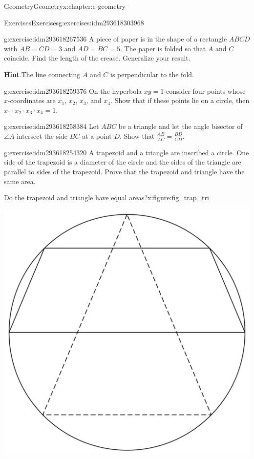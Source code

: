 \documentclass[twoside,10pt,]{book}
\newcommand{\blocktitlefont}{\relax}
\numberwithin{equation}{section}
\begin{document}
\begin{chapterptx}{Geometry}{}{Geometry}{}{}{x:chapter:c-geometry}
\begin{exercises-section}{Exercises}{}{Exercises}{}{}{g:exercises:idm293618303968}
\begin{divisionexercise}{6}{}{}{g:exercise:idm293618267536}%
A piece of paper is in the shape of a rectangle \(ABCD\) with \(AB=CD=3\) and \(AD=BC=5\). The paper is folded so that \(A\) and \(C\) coincide. Find the length of the crease.  Generalize your result.%
\par\smallskip%
\noindent\textbf{\blocktitlefont Hint}.\label{g:hint:idm293618262704}{}\hypertarget{g:hint:idm293618262704}{}\quad{}The line connecting \(A\) and \(C\) is perpendicular to the fold.%
\end{divisionexercise}%
\begin{divisionexercise}{7}{}{}{g:exercise:idm293618259376}%
On the hyperbola \(x y = 1\) consider four points whose \(x\)-coordinates are \(x_1\), \(x_2\), \(x_3\), and \(x_4\). Show that if these points lie on a circle, then \(x_1 \cdot  x_{2} \cdot x_{3}\cdot x_4 = 1\).%
\end{divisionexercise}%
\begin{divisionexercise}{8}{}{}{g:exercise:idm293618258384}%
Let \(ABC\) be a triangle and let the angle bisector of \(\angle A\) intersect the side \(BC\) at a point \(D\). Show that \(\frac{A B}{A C} = \frac{B D}{C D}\).%
\end{divisionexercise}%
\begin{divisionexercise}{9}{}{}{g:exercise:idm293618254320}%
A trapezoid and a triangle are inscribed a circle. One side of the trapezoid is a diameter of the circle and the sides of the  triangle are parallel to sides of the trapezoid. Prove that the trapezoid and triangle have the same area.%
\begin{figureptx}{Do the trapezoid and triangle have equal areas?}{x:figure:fig_trap_tri}{}%
\begin{image}{0.2}{0.6}{0.2}%
\includegraphics[width=\linewidth]{images/fig_trap_tri.png}

\end{image}
\end{figureptx}
\end{divisionexercise}
\end{exercises-section}
\end{chapterptx}
\end{document}

